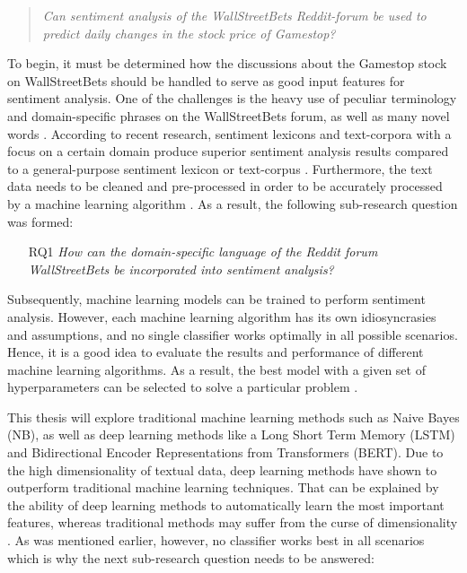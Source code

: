 \documentclass[11pt, a4paper]{article}
\begin{document}
\begin{quote}
\emph{Can sentiment analysis of the WallStreetBets Reddit-forum be used to predict daily changes in the stock price of Gamestop?}
\end{quote}

To begin, it must be determined how the discussions about the Gamestop stock on WallStreetBets should be handled to serve as good input features for sentiment analysis. 
One of the challenges is the heavy use of peculiar terminology and domain-specific phrases on the WallStreetBets forum, as well as many novel words \citep{anand2021WallstreetbetsAgainstWallstreet}. 
According to recent research, sentiment lexicons and text-corpora with a focus on a certain domain produce superior sentiment analysis results compared to a 
general-purpose sentiment lexicon or text-corpus \citep{park2015EfficientExtraction}. Furthermore, the text data needs to be cleaned and pre-processed in order to be accurately 
processed by a machine learning algorithm \citep{jemai2021SentimentAnalysis}. As a result, the following sub-research question was formed:

\begin{itemize}
    \item[RQ1] \emph{How can the domain-specific language of the Reddit forum WallStreetBets be incorporated into sentiment analysis?}
\end{itemize}

Subsequently, machine learning models can be trained to perform sentiment analysis. However, 
each machine learning algorithm has its own idiosyncrasies and assumptions, and no single classifier 
works optimally in all possible scenarios. Hence, it is a good idea to evaluate the results and 
performance of different machine learning algorithms. As a result, the best model with a given set 
of hyperparameters can be selected to solve a particular problem \citep[p. 53]{raschka2019pythonmachinelearning}. 

This thesis will explore traditional machine learning methods such as Naive Bayes (NB), as well as deep learning methods like a
Long Short Term Memory (LSTM) and Bidirectional Encoder Representations from 
Transformers (BERT). %
Due to the high dimensionality of textual data, deep learning methods have shown 
to outperform traditional machine learning techniques. That can be explained by the 
ability of deep learning methods to automatically learn the most important features, whereas traditional 
methods may suffer from the curse of dimensionality \citep{fu2018lexiconenhancedlstm}.
As was mentioned earlier, however, no classifier works best in all scenarios which is why the next sub-research question needs to be answered:
\end{document}
